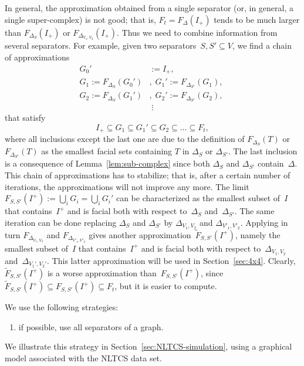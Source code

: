 \documentclass[aos,noinfoline]{imsart}
\newcommand{\face}{F}
\theoremstyle{remark}
\theoremstyle{definition}
\begin{document}
In general, the approximation obtained from a single separator (or, in general, a single super-complex) is not good;
that is, $F_{t}=\face_{\Delta}(I_{+})$ tends to be much larger than $\face_{\Delta_{S}}(I_{+})$ or
$\face_{\Delta_{V_{1},V_{2}}}(I_{+})$.  Thus we need to combine information from several separators.  For example, given
two separators~$S,S'\subseteq V$, we find a chain of approximations
\begin{align*}
  G_{0}' &:= I_{+}, \; \\
  G_{1} := \face_{\Delta_{S}}(G_{0}')&, \;
  G_{1}' := \face_{\Delta_{S'}}(G_{1}), \;\\
  G_{2} := \face_{\Delta_{S}}(G_{1}')&, \;
  G_{2}' := \face_{\Delta_{S'}}(G_{2}), \;\\
  &\;\vdots
\end{align*}
that satisfy
\begin{equation*}
  I_{+}\subseteq G_{1} \subseteq G_{1}' \subseteq G_{2} \subseteq \dots \subseteq F_t,
\end{equation*}
where all inclusions except the last one are due to the definition of $\face_{\Delta_{S}}(T)$ or $\face_{\Delta_{S'}}(T)$  as the smallest facial sets containing $T$ in $\Delta_S$ or $\Delta_{S'}$. The last inclusion is a consequence of Lemma~\ref{lem:sub-complex} since both $\Delta_S$ and $\Delta_{S'}$ contain~$\Delta$.
This chain of approximations has to stabilize; that is, after a certain number of iterations, the
approximations will not improve any more.  The limit $\face_{S,S'}(I^{+}) := \bigcup_{i}G_{i} = \bigcup_{i}G_{i}'$ can
be characterized as the smallest subset of~$I$ that contains~$I^{+}$ and is facial both with respect to~$\Delta_{S}$
and~$\Delta_{S'}$.  The same iteration can be done replacing $\Delta_{S}$ and $\Delta_{S'}$ by $\Delta_{V_{1},V_{2}}$
and $\Delta_{V'_{1},V'_{2}}$.  Applying in turn $\face_{\Delta_{V_{1},V_{2}}}$ and $\face_{\Delta_{V'_{1},V'_{2}}}$
gives another approximation~$\tilde\face_{S,S'}(I^{+})$, namely the smallest subset of~$I$ that contains~$I^{+}$ and is
facial both with respect to~$\Delta_{V_{1},V_{2}}$ and~$\Delta_{V_{1}',V_{2}'}$. This latter approximation will be used
in Section~\ref{sec:4x4}.  Clearly, $\tilde\face_{S,S'}(I^{+})$ is a worse approximation than~$\face_{S,S'}(I^{+})$,
since $\tilde\face_{S,S'}(I^{+})\subseteq\face_{S,S'}(I^{+})\subseteq F_{t}$, but it is easier to compute.

We use the following strategies:
\begin{enumerate}
\item if possible, use all separators of a graph.
\label{strat:all-separators}
\end{enumerate}
We illustrate this strategy in Section~\ref{sec:NLTCS-simulation}, using a graphical model associated with the
NLTCS data set.
\end{document}
